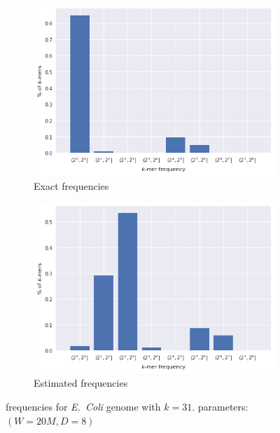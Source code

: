 \begin{figure}[htbp]
    \centering
    \begin{subfigure}{.5\textwidth}
        \centering
        \includegraphics[width=\textwidth]{figures/e_coli-kmer_frequencies-exact-K31}
        \caption{Exact frequencies}\label{fig:ecoli-art-frequencies-exact}
    \end{subfigure}%
    \begin{subfigure}{.5\textwidth}
        \centering
        \includegraphics[width=\textwidth]{figures/e_coli-kmer_frequencies-estimated-K31-W20000000}
        \caption{Estimated frequencies}\label{fig:ecoli-art-frequencies-estimated}
    \end{subfigure}
	\caption{\kmer frequencies for \emph{E.~Coli} genome with $k=31$. \dBCM parameters: $(W=20M, D=8)$}\label{fig:ecoli-art-frequencies}
\end{figure}

